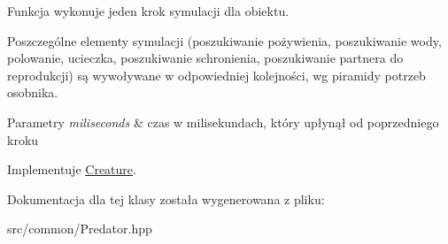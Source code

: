 Funkcja wykonuje jeden krok symulacji dla obiektu. 

Poszczególne elementy symulacji (poszukiwanie pożywienia, poszukiwanie wody, polowanie, ucieczka, poszukiwanie schronienia, poszukiwanie partnera do reprodukcji) są wywoływane w odpowiedniej kolejności, wg piramidy potrzeb osobnika.


\begin{DoxyParams}{Parametry}
{\em miliseconds} & czas w milisekundach, który upłynął od poprzedniego kroku \\
\hline
\end{DoxyParams}


Implementuje \hyperlink{classCreature_af31d92f059f848284d371d3232384538}{Creature}.



Dokumentacja dla tej klasy została wygenerowana z pliku\-:\begin{DoxyCompactItemize}
\item 
src/common/Predator.\-hpp\end{DoxyCompactItemize}
